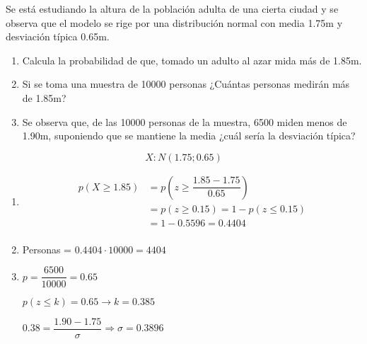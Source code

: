\begin{exercise}
  Se está estudiando la altura de la población adulta de una cierta ciudad y se observa que el modelo se rige por una distribución normal con media 1.75m y desviación típica 0.65m.
  \begin{enumerate}[label=\alph* )]
  \item Calcula la probabilidad de que, tomado un adulto al azar mida más de 1.85m.
  \item Si se toma una muestra de 10000 personas ¿Cuántas personas medirán más de 1.85m?
  \item Se observa que, de las 10000 personas de la muestra, 6500 miden menos de 1.90m, suponiendo que se mantiene la media ¿cuál sería la desviación típica?
  \end{enumerate}

  \tcblower

  \[ X:N(1.75;0.65) \]
  \begin{enumerate}[label=\alph* )]
  \item
  \begin{align*}
  p(X \geq 1.85) & = p \left( z \geq  \dfrac{1.85-1.75}{0.65} \right) \\
  & = p(z \geq 0.15) =1-p(z \leq 0.15) \\
  & = 1-0.5596 = 0.4404 \\
  \end{align*}
  \item
  Personas = $0.4404 \cdot 10000 = 4404$
  \item
  $p=\dfrac{6500}{10000}=0.65$

  $p(z \leq k )=0.65 \rightarrow k = 0.385$

  $0.38 = \dfrac{1.90-1.75}{\sigma} \Rightarrow \sigma = 0.3896$

  \end{enumerate}
\end{exercise}

